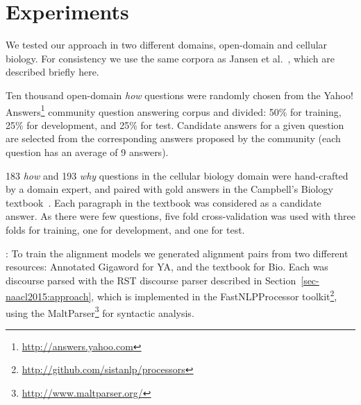 \section{Experiments}
\label{sec-naacl2015:experiments}



We tested our approach in two different domains, open-domain and cellular biology. For consistency we use the same corpora as Jansen et al.~\citeyear{jansen14}, which are described briefly here. 

{}  Ten thousand open-domain \emph{how} questions were randomly chosen from the Yahoo! Answers\footnote{\url{http://answers.yahoo.com}} community question answering corpus and divided: 50\% for training, 25\% for development, and 25\% for test.  Candidate answers for a given question are selected from the corresponding answers proposed by the community (each question has an average of 9 answers).

{} 183 \emph{how} and 193 \emph{why}  questions in the cellular biology domain were hand-crafted by a domain expert, and paired with gold answers in the Campbell's Biology textbook~\cite{Reece:2011}.  Each paragraph in the textbook was considered as a candidate answer.  As there were few questions, five fold cross-validation was used with three folds for training, one for development, and one for test.


{}: To train the alignment models we generated alignment pairs from two different resources: Annotated Gigaword \cite{Napoles2012} for YA, and the textbook for Bio.  Each was discourse parsed with the RST discourse parser described in Section~\ref{sec-naacl2015:approach}, which is implemented in the FastNLPProcessor toolkit\footnote{\url{http://github.com/sistanlp/processors}}, using the MaltParser\footnote{\url{http://www.maltparser.org/}} for syntactic analysis.



